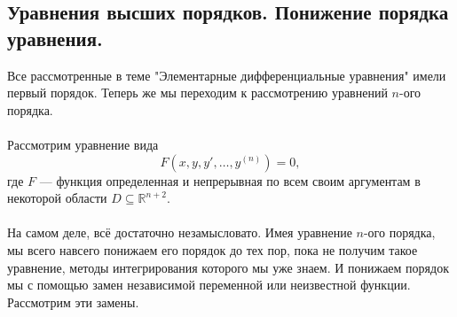 \documentclass[a4paper, 12pt]{report}
\newcommand{\Rm}{\mathbb{R}}
\begin{document}
	\subsection*{Уравнения высших порядков. Понижение порядка уравнения.}
	Все рассмотренные в теме "Элементарные дифференциальные уравнения" имели первый порядок. Теперь же мы переходим к рассмотрению уравнений $n$-ого порядка.\\\\
	Рассмотрим уравнение вида $$F(x, y, y',\ldots, y^{(n)}) = 0,$$
	где $F$ --- функция определенная и непрерывная по всем своим аргументам в некоторой области $D \subseteq \Rm^{n+2}$. \\\\
	На самом деле, всё достаточно незамысловато. Имея уравнение $n$-ого порядка, мы всего навсего понижаем его порядок до тех пор, пока не получим такое уравнение, методы интегрирования которого мы уже знаем. И понижаем порядок мы с помощью замен независимой переменной или неизвестной функции. Рассмотрим эти замены.
\end{document}
